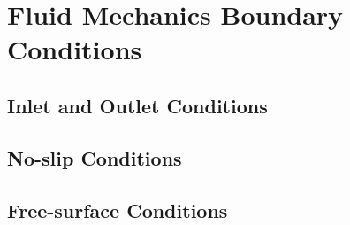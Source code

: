 \section{Fluid Mechanics Boundary Conditions}
\label{sec:FluidBoundaryConditions}

\subsection{Inlet and Outlet Conditions}

\subsection{No-slip Conditions}

\subsection{Free-surface Conditions}


